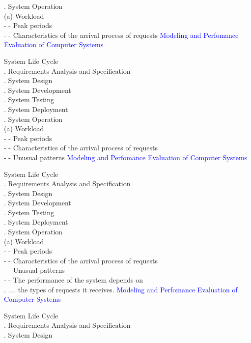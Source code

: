 \documentclass[svgnames]{beamer}
\begin{document}
. System Operation\\[8pt] 
(a) Workload\\
\quad - - \quad Peak periods \\
\quad - - \quad Characteristics of the arrival process of requests 
\newpage
\textcolor{blue}{Modeling and Perfomance Evaluation of Computer Systems} \\[38pt]
\raggedright
\! System Life Cycle\\
. Requirements Analysis and Specification\\
. System Design\\
. System Development\\
. System Testing\\
. System Deployment\\
. System Operation\\[8pt] 
(a) Workload\\
\quad - - \quad Peak periods \\
\quad - - \quad Characteristics of the arrival process of requests\\
\quad - - \quad Unusual patterns 
\newpage
\textcolor{blue}{Modeling and Perfomance Evaluation of Computer Systems} \\[38pt]
\raggedright
\! System Life Cycle\\
. Requirements Analysis and Specification\\
. System Design\\
. System Development\\
. System Testing\\
. System Deployment\\
. System Operation\\[8pt] 
(a) Workload\\
\quad - - \quad Peak periods \\
\quad - - \quad Characteristics of the arrival process of requests\\
\quad - - \quad Unusual patterns \\
\quad - - \quad The performance of the system depends on\\
\quad . \quad .... the types of requests it receives.
\newpage
\textcolor{blue}{Modeling and Perfomance Evaluation of Computer Systems} \\[38pt]
\raggedright
\! System Life Cycle\\
. Requirements Analysis and Specification\\
. System Design\\
\end{document}
